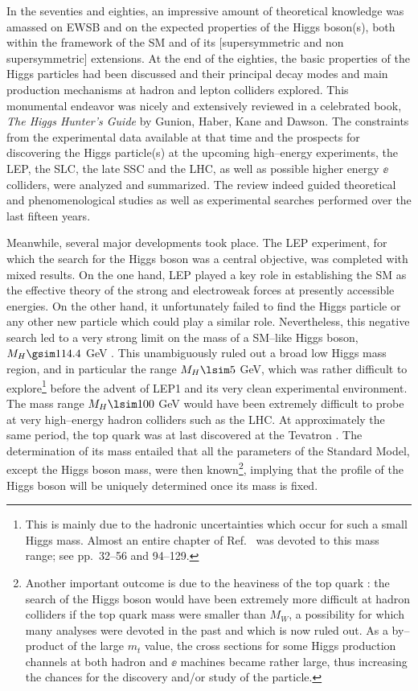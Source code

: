 In the seventies and eighties, an impressive amount of theoretical knowledge
was amassed on EWSB and on the expected properties of the Higgs boson(s), both
within the framework of the SM and  of its [supersymmetric and non 
supersymmetric]
extensions.  At the end of the eighties, the basic properties of the Higgs
particles had been discussed and their principal decay modes and main
production mechanisms at hadron and lepton colliders explored.  This
monumental endeavor was nicely and extensively reviewed in a celebrated book,
{\it The Higgs Hunter's Guide} \cite{HHG} by Gunion, Haber, Kane and
Dawson.  The constraints from the experimental data available at that time and
the prospects for discovering the Higgs particle(s) at the upcoming
high--energy experiments, the LEP, the SLC, the late SSC and the LHC, as well
as possible higher energy $\ee$ colliders, were analyzed and summarized. The
review indeed guided theoretical and phenomenological studies as well as
experimental searches performed over the last fifteen years.\s 

Meanwhile, several major developments took place. The LEP experiment, for which
the search for the Higgs boson was a central objective, was completed with mixed
results. On the one hand,  LEP played a key role in establishing the SM as the
effective theory of the strong and electroweak forces at presently accessible
energies. On the other hand, it unfortunately failed to find the Higgs particle
or any other new particle which could play a similar role.  Nevertheless, this
negative search led to a very strong limit on the mass of a SM--like Higgs
boson, $M_H \gsim 114.4$ GeV \cite{LEP2-Higgs-exp}.  This unambiguously ruled
out a broad low Higgs mass region, and in particular the range $M_H \lsim 5$
GeV, which was rather difficult to explore\footnote{This is mainly due to the
hadronic uncertainties which occur for such a small Higgs mass. Almost an
entire chapter of Ref.~\cite{HHG} was devoted to this mass range; see
pp.~32--56 and 94--129.}  before the advent of LEP1 and its very clean
experimental environment.  The mass range $M_H \lsim 100$ GeV would have been
extremely difficult to probe at very high--energy hadron colliders such as the
LHC.  At approximately the same period, the top quark was at last discovered at
the Tevatron \cite{Top-Discovery}. The determination of its mass entailed
that all the parameters of the Standard Model, except the Higgs boson mass, 
were then known\footnote{Another important outcome is due to the heaviness of 
the top quark \cite{Mt-Tevatron}: the search of the Higgs boson would have been
extremely more difficult at hadron colliders if the top quark mass were smaller
than $M_W$, a possibility for which many analyses were devoted in the past and
which is now ruled out. As a by--product of the large $m_t$ value, the cross
sections for some Higgs production channels at both hadron and $\ee$ machines
became rather large, thus increasing the chances for the discovery and/or 
study of the particle.}, implying that the profile of the Higgs boson will be
uniquely determined once its mass is fixed. \s 

